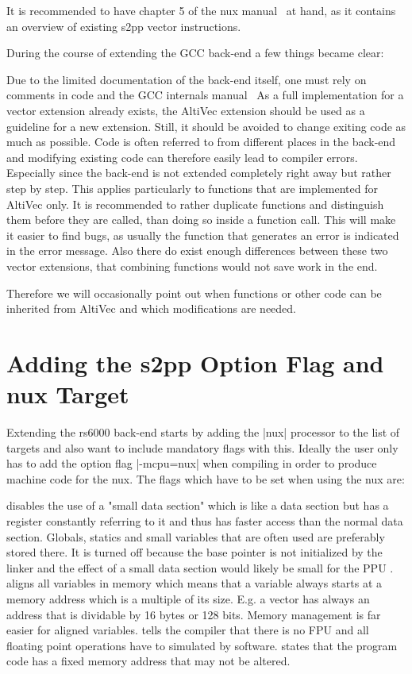 It is recommended to have chapter 5 of the nux manual~\citep[ch.~5]{nuxmanual} at hand, as it contains an overview of existing s2pp vector instructions.

During the course of extending the GCC back-end a few things became clear:

Due to the limited documentation of the back-end itself, one must rely on comments in code and the GCC internals manual~\citep{GCCint} 
As a full implementation for a vector extension already exists, the AltiVec extension should be used as a guideline for a new extension. 
Still, it should be avoided to change exiting code as much as possible.
Code is often referred to from different places in the back-end and modifying existing code can therefore easily lead to compiler errors.
Especially since the back-end is not extended completely right away but rather step by step.
This applies particularly to functions that are implemented for AltiVec only.
It is recommended to rather duplicate functions and distinguish them before they are called, than doing so inside a function call.
This will make it easier to find bugs, as usually the function that generates an error is indicated in the error message.
Also there do exist enough differences between these two vector extensions, that combining functions would not save work in the end.

Therefore we will occasionally point out when functions or other code can be inherited from AltiVec and which modifications are needed.

\section{Adding the s2pp Option Flag and nux Target}
Extending the rs6000 back-end starts by adding the |nux| processor to the list of targets and also want to include mandatory flags with this.
Ideally the user only has to add the option flag |-mcpu=nux| when compiling in order to produce machine code for the nux.
The flags which have to be set when using the nux are:
\begin{description}
        disables the use of a "small data section" which is like a data section but has a register constantly referring to it and thus has faster access than the normal data section. Globals, statics and small variables that are often used are preferably stored there. It is turned off because the base pointer is not initialized by the linker and the effect of a small data section would likely be small for the \ac{PPU} \cite{nuxmanual, ibmsda, websda}.
        aligns all variables in memory which means that a variable always starts at a memory address which is a multiple of its size. E.g. a vector has always an address that is dividable by 16 bytes or 128 bits. Memory management is far easier for aligned variables.
        tells the compiler that there is no FPU and all floating point operations have to simulated by software.
        states that the program code has a fixed memory address that may not be altered.
\end{description}

